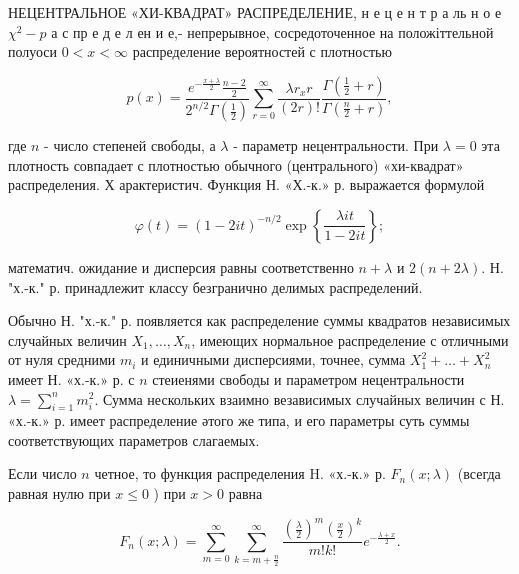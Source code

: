 \documentclass[10pt]{article}
\begin{document}
НЕЦЕНТРАЛЬНОЕ «ХИ-КВАДРАТ» РАСПРЕДЕЛЕНИЕ, н е ц е н т р а ль н о е $\chi^{2}-p$ а с пр е д е л ен и е,- непрерывное, сосредоточенное на положіттельной полуоси $0<x<\infty$ распределение вероятностей с плотностью



\[

p(x)=\frac{e^{-\frac{x+\lambda}{2}} \frac{n-2}{2}}{2^{n / 2} \Gamma\left(\frac{1}{2}\right)} \sum_{r=0}^{\infty} \frac{\lambda r_{x} r}{(2 r) !} \frac{\Gamma\left(\frac{1}{2}+r\right)}{\Gamma\left(\frac{n}{2}+r\right)},

\]



где $n$ - число степеней свободы, а $\lambda$ - параметр нецентральности. При $\lambda=0$ эта плотность совпадает с плотностью обычного (центрального) «хи-квадрат» распределения. Х арактеристич. Функция Н. «Х.-к.» р. выражается формулой



\[

\varphi(t)=(1-2 i t)^{-n / 2} \exp \left\{\frac{\lambda i t}{1-2 i t}\right\} ;

\]



математич. ожидание и дисперсия равны соответственно $n+\lambda$ и $2(n+2 \lambda)$. Н. "х.-к." р. принадлежит классу безгранично делимых распределений.



Обычно Н. "х.-к." р. появляется как распределение суммы квадратов независимых случайных величин $X_{1}, \ldots, X_{n}$, имеющих нормальное распределение с отличными от нуля средними $m_{i}$ и единичными дисперсиями, точнее, сумма $X_{1}^{2}+\ldots+X_{n}^{2}$ имеет Н. «х.-к.» р. с $n$ стеиенями свободы и параметром нецентральности $\lambda=\sum_{i=1}^{n} m_{i}^{2}$. Сумма нескольких взаимно везависимых случайных величин с Н. «х.-к.» р. имеет распределение әтого же типа, и его параметры суть суммы соответствующих параметров слагаемых.



Если число $n$ четное, то функция распределения $\mathrm{H}$. «х.-к.» р. $F_{n}(x ; \lambda)$ (всегда равная нулю при $x \leqslant 0$ ) при $x>0$ равна



\[

F_{n}(x ; \lambda)=\sum_{m=0}^{\infty} \sum_{k=m+\frac{n}{2}}^{\infty} \frac{\left(\frac{\lambda}{2}\right)^{m}\left(\frac{x}{2}\right)^{k}}{m ! k !} e^{-\frac{\lambda+x}{2}} .

\]
\end{document}
